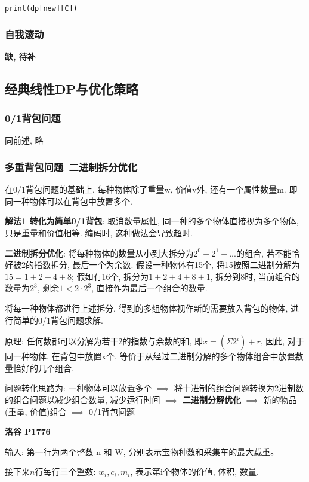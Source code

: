 \documentclass[../main]{subfiles}
\begin{document}
\begin{sloppy}
\begin{lstlisting}[style = Python]
print(dp[new][C])
\end{lstlisting}

\subsubsection{自我滚动}

\textbf{缺, 待补}


\subsection{经典线性DP与优化策略}

\subsubsection{0/1背包问题}

同前述, 略

\subsubsection{多重背包问题\ 二进制拆分优化}

在0/1背包问题的基础上, 每种物体除了重量w, 价值v外, 还有一个属性数量m. 即同一种物体可以在背包中放置多个.

\textbf{解法1 转化为简单0/1背包}: 取消数量属性, 同一种的多个物体直接视为多个物体, 只是重量和价值相等. 编码时, 这种做法会导致超时.

\textbf{二进制拆分优化}: 将每种物体的数量从小到大拆分为$2^0+2^1+...$的组合, 若不能恰好被2的指数拆分, 最后一个为余数. 假设一种物体有15个, 将15按照二进制分解为$15=1+2+4+8$; 假如有16个, 拆分为$1+2+4+8+1$, 拆分到8时, 当前组合的数量为$2^3$, 剩余$1<2 \cdot 2^3$, 直接作为最后一个组合的数量.

将每一种物体都进行上述拆分, 得到的多组物体视作新的需要放入背包的物体, 进行简单的0/1背包问题求解.

原理: 任何数都可以分解为若干2的指数与余数的和, 即$x = (\Sigma{2^i}) + r$, 因此, 对于同一种物体, 在背包中放置x个, 等价于从经过二进制分解的多个物体组合中放置数量恰好的几个组合. 

问题转化思路为: 一种物体可以放置多个 $\implies$ 将十进制的组合问题转换为2进制数的组合问题以减少组合数量, 减少运行时间 $\implies$ \textbf{二进制分解优化} $\implies$ 新的物品(重量, 价值)组合 $\implies$ 0/1背包问题

\textbf{洛谷 P1776}

输入: 第一行为两个整数 n 和 W, 分别表示宝物种数和采集车的最大载重。

接下来$n$行每行三个整数: $w_i, c_i, m_i$, 表示第i个物体的价值, 体积, 数量.


\end{sloppy}
\end{document}

